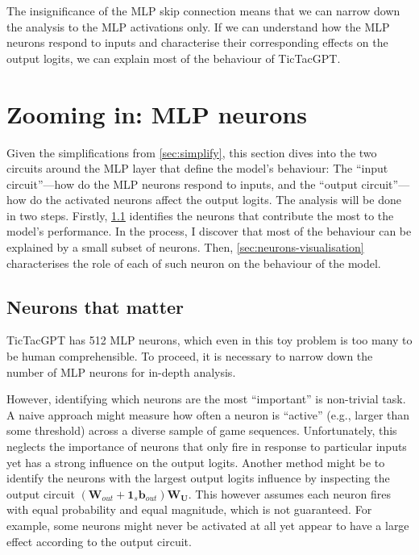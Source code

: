 \documentclass{article}
\newcommand{\ttgpt}{TicTacGPT\xspace}
\renewcommand{\v}[1]{\mathbf{\bm{#1}}}
\newcommand{\m}[1]{\mathbf{\bm{#1}}}
\newcounter{num}
\begin{document}
The insignificance of the MLP skip connection means that we can narrow down the analysis to the MLP activations only. If we can understand how the MLP neurons respond to inputs and characterise their corresponding effects on the output logits, we can explain most of the behaviour of \ttgpt.

\section{Zooming in: MLP neurons}

Given the simplifications from \cref{sec:simplify}, this section dives into the two circuits around the MLP layer that define the model's behaviour: The ``input circuit''---how do the MLP neurons respond to inputs, and the ``output circuit''---how do the activated neurons affect the output logits. The analysis will be done in two steps. Firstly, \cref{sec:neurons-that-matter} identifies the neurons that contribute the most to the model's performance. In the process, I discover that most of the behaviour can be explained by a small subset of neurons. Then, \cref{sec:neurons-visualisation} characterises the role of each of such neuron on the behaviour of the model.

\subsection{Neurons that matter} \label{sec:neurons-that-matter}



\ttgpt has 512 MLP neurons, which even in this toy problem is too many to be human comprehensible. To proceed, it is necessary to narrow down the number of MLP neurons for in-depth analysis.

However, identifying which neurons are the most ``important'' is non-trivial task. A naive approach might measure how often a neuron is ``active'' (e.g., larger than some threshold) across a diverse sample of game sequences. Unfortunately, this neglects the importance of neurons that only fire in response to particular inputs yet has a strong influence on the output logits. Another method might be to identify the neurons with the largest output logits influence by inspecting the output circuit $(\m{W}_{out} + \v{1}_s \v{b}_{out}) \m{W_U}$. This however assumes each neuron fires with equal probability and equal magnitude, which is not guaranteed. For example, some neurons might never be activated at all yet appear to have a large effect according to the output circuit.
\end{document}

